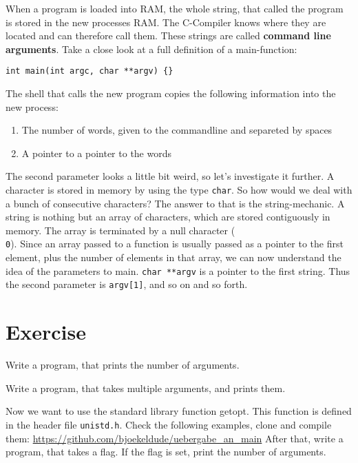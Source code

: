 \documentclass{dcbl/challenge}
\begin{document}
When a program is loaded into RAM, the whole string, that called the program is stored in the new processes RAM.
The C-Compiler knows where they are located and can therefore call them.
These strings are called \textbf{command line arguments}.
Take a close look at a full definition of a main-function:
\begin{lstlisting}
int main(int argc, char **argv) {}
\end{lstlisting}
The shell that calls the new program copies the following information into the new process:
\begin{enumerate}
    \item The number of words, given to the commandline and separeted by spaces
    \item A pointer to a pointer to the words
\end{enumerate}
The second parameter looks a little bit weird, so let's investigate it further.
A character is stored in memory by using the type \texttt{char}.
So how would we deal with a bunch of consecutive characters? 
The answer to that is the string-mechanic. 
A string is nothing but an array of characters, which are stored contiguously in memory.
The array is terminated by a null character (\texttt{\\0}).
Since an array passed to a function is usually passed as a pointer to the first element, plus the number of elements in that array, we can now understand the idea of the parameters to main.
\texttt{char **argv} is a pointer to the first string. 
Thus the second parameter is \texttt{argv[1]}, and so on and so forth.
\section*{Exercise}
\begin{aufgabe}
    Write a program, that prints the number of arguments.
\end{aufgabe}

\begin{aufgabe}
    Write a program, that takes multiple arguments, and prints them.
\end{aufgabe}

\begin{aufgabe}
    Now we want to use the standard library function getopt.
    This function is defined in the header file \texttt{unistd.h}.
    Check the following examples, clone and compile them: \url{https://github.com/bjoekeldude/uebergabe_an_main} 
    After that, write a program, that takes a flag.
    If the flag is set, print the number of arguments.
\end{aufgabe}
\end{document}
